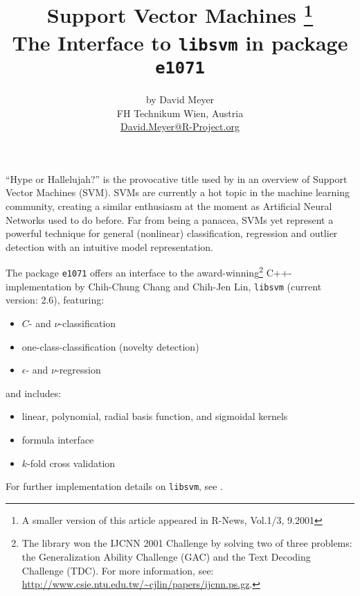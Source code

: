\documentclass[a4paper]{article}
\newcommand{\pkg}[1]{\texttt{#1}}
\begin{document}





\title{Support Vector Machines
  \footnote{A smaller version of this
    article appeared in R-News, Vol.1/3, 9.2001}\\ 
\large The Interface to \texttt{libsvm} in package \pkg{e1071}}
\author{by David Meyer\\
  FH Technikum Wien, Austria\\
\url{David.Meyer@R-Project.org}
}
\maketitle
\sloppy

``Hype or Hallelujah?'' is the provocative title used by
\cite{svm:bennett+campbell:2000} in an overview of Support Vector
Machines (SVM).
SVMs are currently a hot topic in the machine learning community,
creating a similar enthusiasm at the moment as Artificial Neural
Networks used to do before. Far from being a panacea, SVMs yet
represent a powerful technique for
general (nonlinear) classification, regression and outlier detection with an intuitive
model representation.

The package \pkg{e1071} offers an interface to the
award-winning\footnote{The library won the IJCNN 2001 Challenge by solving two of
  three problems: the Generalization Ability Challenge (GAC) and the Text
  Decoding Challenge (TDC). For more information, see: \url{http://www.csie.ntu.edu.tw/~cjlin/papers/ijcnn.ps.gz}.}
C++-implementation by Chih-Chung Chang and Chih-Jen Lin,
\texttt{libsvm} (current version: 2.6), featuring:
\begin{itemize}
\item $C$- and $\nu$-classification
\item one-class-classification (novelty detection)
\item $\epsilon$- and $\nu$-regression
\end{itemize}
and includes:
\begin{itemize}
\item linear, polynomial, radial basis function, and sigmoidal kernels
\item formula interface
\item $k$-fold cross validation
\end{itemize}
For further implementation details on \texttt{libsvm}, see \cite{svm:chang+lin:2001}.
\end{document}
